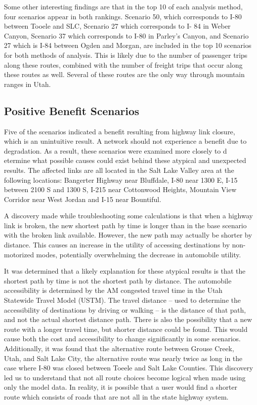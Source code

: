 Some other interesting findings are that in the top 10 of each analysis
method, four scenarios appear in both rankings. Scenario 50, which
corresponds to I-80 between Tooele and SLC, Scenario 27 which corresponds to I-
84 in Weber Canyon, Scenario 37 which corresponds to I-80 in Parley’s Canyon,
and Scenario 27 which is I-84 between Ogden and Morgan, are included in the
top 10 scenarios for both methods of analysis. This is likely due to the
number of passenger trips along these routes, combined with the number of freight
trips that occur along these routes as well. Several of these routes are
the only way through mountain ranges in Utah.

\subsection{Positive Benefit Scenarios}

Five of the scenarios indicated a benefit resulting from highway link closure,
which is an unintuitive result. A network should not experience a benefit due
to degradation. As a result, these scenarios were examined more closely to d
etermine what possible causes could exist behind these atypical and unexpected
results. The affected links are all located in the Salt Lake Valley area at the
following locations: Bangerter Highway near Bluffdale, I-80 near 1300 E, I-15
between 2100 S and 1300 S, I-215 near Cottonwood Heights, Mountain View
Corridor near West Jordan and I-15 near Bountiful.

A discovery made while troubleshooting some calculations is that when a highway link is broken, the new
shortest path by time is longer than in the base scenario with the broken link
available. However, the new path may actually be shorter by distance. This
causes an increase in the utility of accessing destinations by non-
motorized modes, potentially overwhelming the decrease in automobile
utility.

It was determined that a likely explanation for these atypical results is that the shortest path by time is not the shortest path by
distance. The automobile accessibility is determined by the AM congested
travel time in the Utah Statewide Travel Model (USTM). The travel distance
– used to determine the accessibility of destinations by driving or
walking – is the distance of that path, and not the actual shortest
distance path. There is also the possibility that a new route with a longer travel time, but shorter distance could be found. This would cause both the cost and accessibility to change significantly in some scenarios. Additionally, it was found that
the alternative route between Grouse Creek, Utah, and Salt Lake City, the alternative
route was nearly twice as long in the case where I-80 was closed between
Toeele and Salt Lake Counties. This discovery led us to understand that not all
route choices become logical when made using only the model data. In
reality, it is possible that a user would find a shorter route
which consists of roads that are not all in the state highway system.


